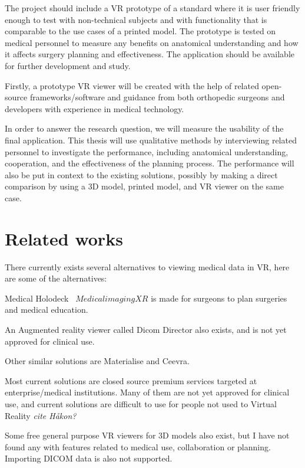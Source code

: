 \documentclass[a4paper]{report}
\begin{document}
The project should include a VR prototype of a standard where it is
user friendly enough to test with non-technical subjects and with functionality
that is comparable to the use cases of a printed model.
The prototype is tested on medical personnel to measure any benefits on anatomical understanding and how it affects surgery planning and effectiveness.
The application should be available for further development and study.

Firstly, a prototype VR viewer will be created with the help of related
open-source frameworks/software and guidance from both orthopedic surgeons and
developers with experience in medical technology.

In order to answer the research question, we will measure the
usability of the final application. This thesis will use qualitative methods
by interviewing related personnel to investigate the performance, including
anatomical understanding, cooperation, and the effectiveness of the planning
process.
The performance will also be put in context to the existing solutions, possibly
by making a direct comparison by using a 3D model, printed model, and VR viewer
on the same case.

\section{Related works}

There currently exists several alternatives to viewing medical data in VR, here are some of the alternatives:

Medical Holodeck~\cite{medical_holodeck_medicalholodeck_nodate} $Medical imaging XR$ is made for surgeons to plan surgeries and medical education.

An Augmented reality viewer called Dicom Director also exists, and is not yet approved for clinical use.\cite{dicomdirectorcom_surgeons_nodate}

Other similar solutions are Materialise\cite{materialise_medical_nodate} and
Ceevra\cite{ceevra_inc_using_2019}.

Most current solutions are closed source premium services targeted at enterprise/medical institutions. Many of them are not yet approved for clinical use, and current solutions are difficult to use for people not used to Virtual Reality \emph{cite Håkon?}

Some free general purpose VR viewers for 3D models also exist, but I have not found any with features related to medical use, collaboration or planning. Importing DICOM data is also not supported.
\end{document}
